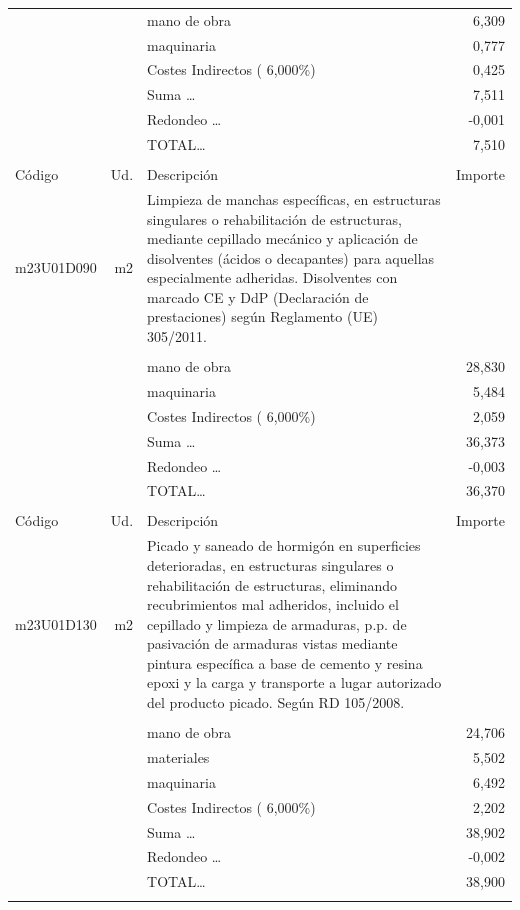 \begin{supertabular}{l r p{60mm} r}
&&mano de obra&     6,309\\%
&&maquinaria&     0,777\\%
&&Costes Indirectos (     6,000\%)&     0,425\\%
&&Suma \ldots&     7,511\\%
&&Redondeo \ldots&    {-}0,001\\%
%
&&TOTAL\ldots&     7,510\\%
&&&\\%
Código&Ud.&Descripción&Importe\\%
\hline%
m23U01D090&m2&Limpieza de manchas específicas, en estructuras singulares o rehabilitación de estructuras, mediante cepillado mecánico y aplicación de disolventes (ácidos o decapantes) para aquellas especialmente adheridas. Disolventes con marcado CE y DdP (Declaración de prestaciones) según Reglamento (UE) 305/2011.&\\%
&&&\\%
&&mano de obra&    28,830\\%
&&maquinaria&     5,484\\%
&&Costes Indirectos (     6,000\%)&     2,059\\%
&&Suma \ldots&    36,373\\%
&&Redondeo \ldots&    {-}0,003\\%
%
&&TOTAL\ldots&    36,370\\%
&&&\\%
Código&Ud.&Descripción&Importe\\%
\hline%
m23U01D130&m2&Picado y saneado de hormigón en superficies deterioradas, en estructuras singulares o rehabilitación de estructuras, eliminando recubrimientos mal adheridos, incluido el cepillado y limpieza de armaduras, p.p. de pasivación de armaduras vistas mediante pintura específica a base de cemento y resina epoxi y la carga y transporte a lugar autorizado del producto picado. Según RD 105/2008.&\\%
&&&\\%
&&mano de obra&    24,706\\%
&&materiales&     5,502\\%
&&maquinaria&     6,492\\%
&&Costes Indirectos (     6,000\%)&     2,202\\%
&&Suma \ldots&    38,902\\%
&&Redondeo \ldots&    {-}0,002\\%
%
&&TOTAL\ldots&    38,900\\%
&&&\\%

\end{supertabular}
